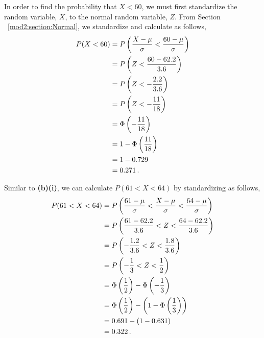 \begin{subquestions}
\begin{subsubquestions}
In order to find the probability that $X<60$, we must first standardize the random variable, $X$, to the normal random variable, $Z$. From Section ~\ref{mod2:section:Normal}, we standardize and calculate as follows,
\begin{align}
	P (X<60) & = P\left(\frac{X - \mu}{\sigma} < \frac{60 - \mu}{\sigma} \right) \nonumber \\
	         & = P\left(Z < \frac{60-62.2}{3.6} \right) \nonumber \\
	         & = P\left(Z < -\frac{2.2}{3.6} \right) \nonumber \\	
	         & = P\left(Z < -\frac{11}{18} \right) \nonumber \\
	         & = \Phi\left(-\frac{11}{18} \right) \nonumber \\
	         & = 1 - \Phi\left(\frac{11}{18} \right) \nonumber \\
	         & = 1 - 0.729 \nonumber \\
	         & = 0.271 \,.	
\end{align}
	

\subsubquestion

Similar to \textbf{(b)(i)}, we can calculate $P(61<X<64)$ by standardizing as follows,
\begin{align}
	P(61<X<64) & = P\left(\frac{61- \mu}{\sigma} < \frac{X - \mu}{\sigma} < \frac{64 - \mu}{\sigma} \right) \nonumber \\
	           & = P\left(\frac{61- 62.2}{3.6} < Z < \frac{64 - 62.2}{3.6} \right) \nonumber \\
	           & = P\left(-\frac{1.2}{3.6} < Z < \frac{1.8}{3.6} \right) \nonumber \\
	           & = P\left(-\frac{1}{3} < Z < \frac{1}{2} \right) \nonumber \\
	           & = \Phi\left(\frac{1}{2} \right) - \Phi\left(-\frac{1}{3}\right) \nonumber \\
	           & = \Phi\left(\frac{1}{2} \right) - \left(1 - \Phi\left(\frac{1}{3}\right) \right) \nonumber \\
	           & = 0.691 - (1 - 0.631) \nonumber \\
	           & = 0.322 \,.
\end{align}

\end{subsubquestions}



\end{subquestions}
